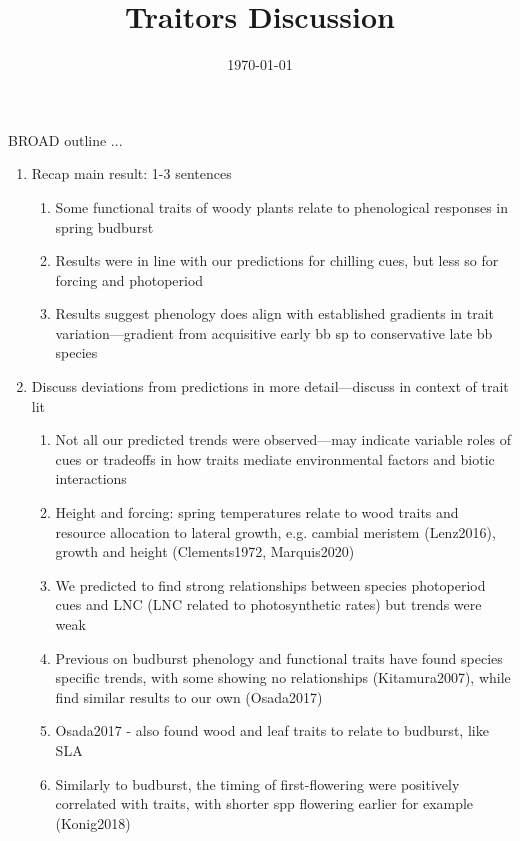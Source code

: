 \documentclass{article}
\begin{document}
\title{Traitors Discussion}
\date{\today}

\maketitle 

BROAD outline ...

\begin{enumerate}

\item Recap main result: 1-3 sentences
\begin{enumerate}
\item Some functional traits of woody plants relate to phenological responses in spring budburst
\item Results were in line with our predictions for chilling cues, but less so for forcing and photoperiod
\item Results suggest phenology does align with established gradients in trait variation---gradient from acquisitive early bb sp to conservative late bb species
\end{enumerate}

\item Discuss deviations from predictions in more detail---discuss in context of trait lit
\begin{enumerate}
\item Not all our predicted trends were observed---may indicate variable roles of cues or tradeoffs in how traits mediate environmental factors and biotic interactions
\item Height and forcing: spring temperatures relate to wood traits and resource allocation to lateral growth, e.g. cambial meristem (Lenz2016), growth and height (Clements1972, Marquis2020)
\item We predicted to find strong relationships between species photoperiod cues and LNC (LNC related to photosynthetic rates) but trends were weak
\item Previous on budburst phenology and functional traits have found species specific trends, with some showing no relationships (Kitamura2007), while find similar results to our own (Osada2017)
\item Osada2017 - also found wood and leaf traits to relate to budburst, like SLA
\item Similarly to budburst, the timing of first-flowering were positively correlated with traits, with shorter spp flowering earlier for example (Konig2018)
\end{enumerate}


\end{enumerate}
\end{document}
